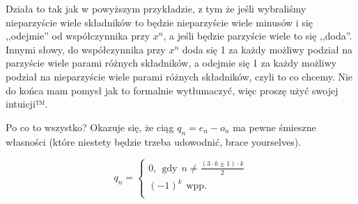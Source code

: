 Działa to tak jak w powyższym przykładzie, z tym że jeśli wybraliśmy nieparzyście wiele składników to będzie nieparzyście wiele minusów i się ,,odejmie'' od współczynnika przy $x^n$, a jeśli będzie parzyście wiele to się ,,doda''. Innymi słowy, do współczynnika przy $x^n$ doda się 1 za każdy możliwy podział na parzyście wiele parami różnych składników, a odejmie się 1 za każdy możliwy podział na nieparzyście wiele parami różnych składników, czyli to co chcemy. Nie do końca mam pomysł jak to formalnie wytłumaczyć, więc proszę użyć swojej intuicji™.

Po co to wszystko? Okazuje się, że ciąg $q_n = e_n - o_n$ ma pewne śmieszne własności (które niestety będzie trzeba udowodnić, brace yourselves).

\begin{theorem}[Eulera]
	\begin{equation}
		q_n = \begin{cases}
			0, \hspace{5pt} \mathrm{gdy} \hspace{5pt} n \not = \frac{(3 \cdot k \pm 1) \cdot k }{2} \\
			(-1)^k \hspace{5pt} \mathrm{wpp.}                                                       \\
		\end{cases}
	\end{equation}

\end{theorem}

